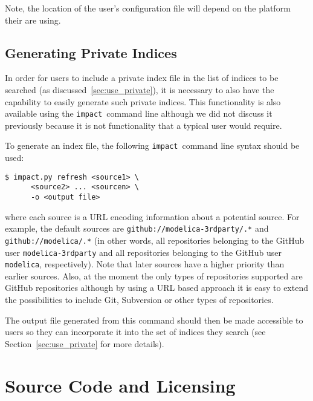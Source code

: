 \documentclass[11pt,a4paper,twocolumn]{article}
\newcommand{\impact}{\texttt{impact}} %
\newcommand{\code}[1]{\texttt{#1}} %
\begin{document}

Note, the location of the user's configuration file will depend on the
platform their are using.

\subsection{Generating Private Indices}
\label{sec:gen_private}


In order for users to include a private index file in the list of
indices to be searched (as discussed~\ref{sec:use_private}), it is
necessary to also have the capability to easily generate such private
indices.  This functionality is also available using the
\impact\ command line although we did not discuss it previously
because it is not functionality that a typical user would require.

To generate an index file, the following \impact\ command line syntax
should be used:

\begin{verbatim}
$ impact.py refresh <source1> \
      <source2> ... <sourcen> \
      -o <output file>
\end{verbatim}

where each source is a URL encoding information about a potential
source.  For example, the default sources are
\code{github://modelica-3rdparty/.*} and \code{github://modelica/.*}
(in other words, all repositories belonging to the GitHub user
\code{modelica-3rdparty} and all repositories belonging to the GitHub
user \code{modelica}, respectively).  Note that later sources have a
higher priority than earlier sources.  Also, at the moment the only
types of repositories supported are GitHub repositories although by
using a URL based approach it is easy to extend the possibilities to
include Git, Subversion or other types of repositories.

The output file generated from this command should then be made
accessible to users so they can incorporate it into the set of indices
they search (see Section~\ref{sec:use_private} for more details).

\section{Source Code and Licensing}
\label{sec:source}
\end{document}
